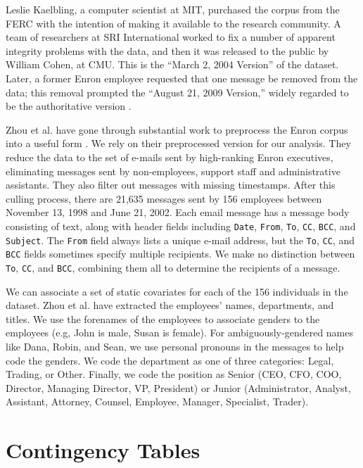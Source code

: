 \documentclass[aoas,preprint]{imsart}
\begin{document}
Leslie Kaelbling, a computer scientist at MIT, purchased the corpus from the
FERC with the intention of making it available to the research community. A
team of researchers at SRI International worked to fix a number of apparent
integrity problems with the data, and then it was released to the public by
William Cohen, at CMU. This is the ``March 2, 2004 Version'' of the dataset.
Later, a former Enron employee requested that one message be removed from the
data; this removal prompted the ``August 21, 2009 Version,'' widely regarded
to be the authoritative version \cite{cohen2009enron}.

Zhou et al. have gone through substantial work to preprocess the Enron corpus
into a useful form \cite{zhou2007strategies}. We rely on their preprocessed
version for our analysis. They reduce the data to the set of e-mails sent by
high-ranking Enron executives, eliminating messages sent by non-employees,
support staff and administrative assistants. They also filter out messages
with missing timestamps. After this culling process, there are 21,635 messages
sent by 156 employees between November 13, 1998 and June 21, 2002. Each email
message has a message body consisting of text, along with header fields
including \texttt{Date}, \texttt{From}, \texttt{To}, \texttt{CC},
\texttt{BCC}, and \texttt{Subject}. The \texttt{From} field always lists a
unique e-mail address, but the \texttt{To}, \texttt{CC}, and \texttt{BCC}
fields sometimes specify multiple recipients. We make no distinction between
\texttt{To}, \texttt{CC}, and \texttt{BCC}, combining them all to determine
the recipients of a message.

We can associate a set of static covariates for each of the 156 individuals in
the dataset. Zhou et al. have extracted the employees' names, departments, and
titles. We use the forenames of the employees to associate genders to the
employees (e.g, John is male, Susan is female). For ambiguously-gendered names
like Dana, Robin, and Sean, we use personal pronouns in the messages to help
code the genders. We code the department as one of three categories: Legal,
Trading, or Other. Finally, we code the position as Senior (CEO, CFO, COO,
Director, Managing Director, VP, President) or Junior (Administrator, Analyst,
Assistant, Attorney, Counsel, Employee, Manager, Specialist, Trader).


\section{Contingency Tables}
\end{document}

